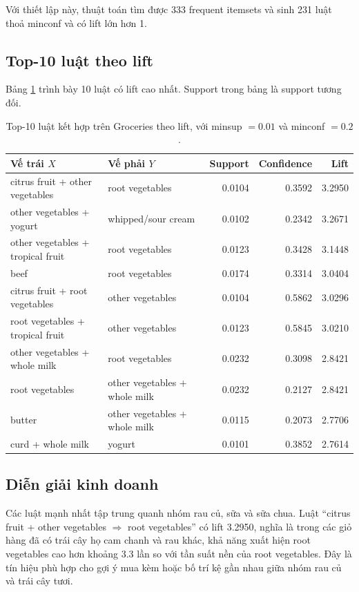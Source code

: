 Với thiết lập này, thuật toán tìm được 333 frequent itemsets và sinh 231 luật thoả minconf và có lift lớn hơn 1.

\subsection{Top-10 luật theo lift}

Bảng \ref{tab:grocery-rules} trình bày 10 luật có lift cao nhất. Support trong bảng là support tương đối.

\begin{table}[H]
    \centering
    \caption{Top-10 luật kết hợp trên Groceries theo lift, với minsup $=0.01$ và minconf $=0.2$.}
    \label{tab:grocery-rules}
    \small
    \begin{tabular}{p{5.0cm} p{3.2cm} r r r}
        \toprule
        Vế trái $X$ & Vế phải $Y$ & Support & Confidence & Lift \\
        \midrule
        citrus fruit + other vegetables & root vegetables & 0.0104 & 0.3592 & 3.2950 \\
        other vegetables + yogurt & whipped/sour cream & 0.0102 & 0.2342 & 3.2671 \\
        other vegetables + tropical fruit & root vegetables & 0.0123 & 0.3428 & 3.1448 \\
        beef & root vegetables & 0.0174 & 0.3314 & 3.0404 \\
        citrus fruit + root vegetables & other vegetables & 0.0104 & 0.5862 & 3.0296 \\
        root vegetables + tropical fruit & other vegetables & 0.0123 & 0.5845 & 3.0210 \\
        other vegetables + whole milk & root vegetables & 0.0232 & 0.3098 & 2.8421 \\
        root vegetables & other vegetables + whole milk & 0.0232 & 0.2127 & 2.8421 \\
        butter & other vegetables + whole milk & 0.0115 & 0.2073 & 2.7706 \\
        curd + whole milk & yogurt & 0.0101 & 0.3852 & 2.7614 \\
        \bottomrule
    \end{tabular}
\end{table}

\subsection{Diễn giải kinh doanh}

Các luật mạnh nhất tập trung quanh nhóm rau củ, sữa và sữa chua. Luật ``citrus fruit + other vegetables $\Rightarrow$ root vegetables'' có lift 3.2950, nghĩa là trong các giỏ hàng đã có trái cây họ cam chanh và rau khác, khả năng xuất hiện root vegetables cao hơn khoảng 3.3 lần so với tần suất nền của root vegetables. Đây là tín hiệu phù hợp cho gợi ý mua kèm hoặc bố trí kệ gần nhau giữa nhóm rau củ và trái cây tươi.

